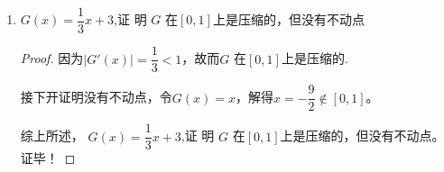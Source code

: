 \begin{example}
\begin{enumerate}
\begin{proof}
            根据Gauss消元的性质，得到
            \[
                \boldsymbol{A}_2 = \boldsymbol{A}'_2-\dfrac{1}{a_{11}}\begin{bmatrix}
                    a_{21}\boldsymbol{a}_{1}^{\mathrm{T}}\\a_{31}\boldsymbol{a}_{1}^{\mathrm{T}}\\\ddots\\a_{n1}\boldsymbol{a}_{1}^{\mathrm{T}}
                \end{bmatrix}
            \]
            所以，有
            \[
                \begin{aligned}
                    \boldsymbol{A}_2^{\mathrm{T}} &= \boldsymbol{A}_2^{'\mathrm{T}}-\dfrac{1}{a_{11}}\begin{bmatrix}
                        a_{21}\boldsymbol{a}_1 & a_{31}\boldsymbol{a}_1 \cdots & a_{n1}\boldsymbol{a}_1
                    \end{bmatrix}\\
                    &=\boldsymbol{A}'_2-\dfrac{1}{a_{11}}\begin{bmatrix}
                        a_{21}\boldsymbol{a}_{1}^{\mathrm{T}}\\a_{31}\boldsymbol{a}_{1}^{\mathrm{T}}\\\cdots\\a_{n1}\boldsymbol{a}_{1}^{\mathrm{T}}
                    \end{bmatrix}
                \end{aligned}
            \] 
        \end{proof}
        \item $G(x) = \dfrac{1}{3}x + 3$,证 明 $G$ 在$[0,1]$上是压缩的，但没有不动点
        \begin{proof}
            因为$|G'(x)| = \dfrac{1}{3}<1$，故而$G$ 在$[0,1]$上是压缩的.

            接下开证明没有不动点，令$G(x) = x$，解得$x = -\dfrac{9}{2}\notin [0,1]$。
            
            综上所述， $G(x) = \dfrac{1}{3}x+ 3$,证 明 $G$ 在$[0,1]$上是压缩的，但没有不动点。证毕！
        \end{proof}
    \end{enumerate}
\end{example}
